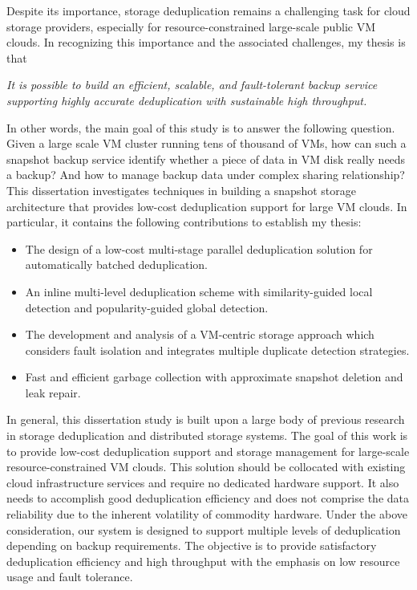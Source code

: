 Despite its importance, storage deduplication remains a challenging task for cloud storage providers,
especially for resource-constrained large-scale public VM clouds.
In recognizing this importance and
the associated challenges,  my thesis is that

\textit{It  is  possible  to  build  an efficient, scalable, and fault-tolerant backup service
supporting highly accurate deduplication with sustainable high throughput.}

In  other  words,  the  main  goal  of this  study  is  to  answer  the  following
question.  Given a large scale VM cluster running tens of thousand of VMs,
how can such a snapshot backup service identify whether a piece of data in VM disk
really needs a backup? And how to manage backup data under complex sharing relationship?
This dissertation investigates
techniques  in  building  a snapshot storage architecture that provides
low-cost deduplication support for large VM clouds.  In particular,  it
contains the following contributions to establish my thesis:

\begin{itemize}
\item The design of a low-cost multi-stage parallel deduplication solution for automatically batched deduplication.
\item An inline multi-level deduplication scheme with similarity-guided local detection and
popularity-guided global detection.
\item The development and analysis of a VM-centric storage approach which considers fault isolation and integrates multiple duplicate detection strategies.
\item Fast and efficient garbage collection with approximate snapshot deletion and leak repair.
\end{itemize}

In general, this  dissertation  study  is  built  upon  a  large  body  of previous  research
in storage deduplication and distributed storage systems.  The goal
of this work is to provide low-cost deduplication support and storage management for
large-scale resource-constrained VM clouds. This solution should be collocated with existing
cloud infrastructure services and require no dedicated hardware support. It also needs to
accomplish good deduplication efficiency and does not comprise the data reliability due to the
inherent volatility of commodity hardware.
Under the  above consideration, our system is designed to support multiple levels of deduplication
depending on backup requirements. The objective is to provide satisfactory deduplication efficiency
and high throughput with the emphasis on low resource usage and fault tolerance.

